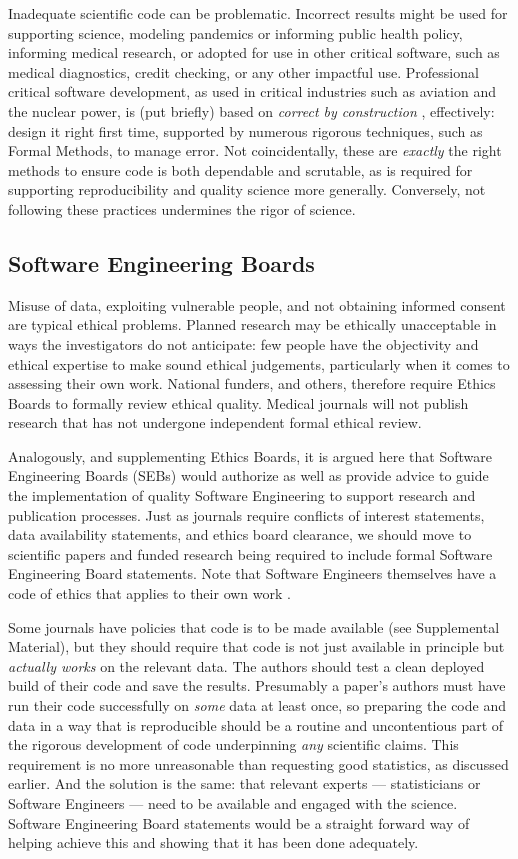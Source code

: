 \documentclass{comjnl}
\def\supplement{Supplemental Material}
\begin{document}
Inadequate scientific code can be problematic. Incorrect results might be used for supporting science, modeling pandemics or informing public health policy, informing medical research, or adopted for use in other critical software, such as medical diagnostics, credit checking, or any other impactful use. Professional critical software development, as used in critical industries such as aviation and the nuclear power, is (put briefly) based on \emph{correct by construction\/} \cite{cbc}, effectively: design it right first time, supported by numerous rigorous techniques, such as Formal Methods, to manage error. Not coincidentally, these are \emph{exactly\/} the right methods to ensure code is both dependable and scrutable, as is required for supporting reproducibility and quality science more generally. Conversely, not following these practices undermines the rigor of science. 

\subsection{Software Engineering Boards}
Misuse of data, exploiting vulnerable people, and not obtaining informed consent are typical ethical problems. Planned research may be ethically unacceptable in ways the investigators do not anticipate: few people have the objectivity and ethical expertise to make sound ethical judgements, particularly when it comes to assessing their own work. National funders, and others, therefore require Ethics Boards to formally review ethical quality. Medical journals will not publish research that has not undergone independent formal ethical review. 

Analogously, and supplementing Ethics Boards, it is argued here that Software Engineering Boards (SEBs) would authorize as well as provide advice to guide the implementation of quality Software Engineering to support research and publication processes. Just as journals require conflicts of interest statements, data availability statements, and ethics board clearance, we should move to scientific papers and funded research being required to include formal Software Engineering Board statements. Note that Software Engineers themselves have a code of ethics that applies to their own work \cite{ethics-code}.

Some journals have policies that code is to be made available (see \supplement), but they should require that code is not just available in principle but \emph{actually works\/} on the relevant data. The authors should test a clean deployed build of their code and save the results. Presumably a paper's authors must have run their code successfully on \emph{some\/} data at least once, so preparing the code and data in a way that is reproducible should be a routine and uncontentious part of the rigorous development of code underpinning \emph{any\/} scientific claims. This requirement is no more unreasonable than requesting good statistics, as discussed earlier. And the solution is the same: that relevant experts --- statisticians or Software Engineers --- need to be available and engaged with the science. Software Engineering Board statements would be a straight forward way of helping achieve this and showing that it has been done adequately.
\end{document}
